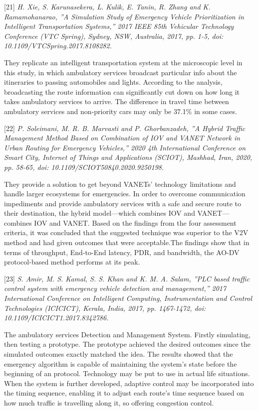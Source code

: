\documentclass[conference]{IEEEtran}
\begin{document}
[21]\emph{ H. Xie, S. Karunasekera, L. Kulik, E. Tanin, R.
Zhang and K. Ramamohanarao, ”A Simulation Study of
Emergency Vehicle Prioritization in Intelligent Transportation
Systems,” 2017 IEEE 85th Vehicular Technology Conference
(VTC Spring), Sydney, NSW, Australia, 2017, pp. 1-5, doi:
10.1109/VTCSpring.2017.8108282. }

They replicate an intelligent transportation system at the microscopic level in this study, in which ambulatory services broadcast particular info about the itineraries to passing automobiles and lights. According to the analysis, broadcasting the route information can significantly cut down on how long it takes ambulatory services to arrive. The difference in travel time between ambulatory services and non-priority cars may only be 37.1\% in some cases.

[22]\emph{ P. Soleimani, M. R. B. Marvasti and P. Ghorbanzadeh,
”A Hybrid Traffic Management Method Based on Combination
of IOV and VANET Network in Urban Routing for Emergency
Vehicles,” 2020 4th International Conference on Smart City,
Internet of Things and Applications (SCIOT), Mashhad, Iran,
2020, pp. 58-65, doi: 10.1109/SCIOT50840.2020.9250198. }

 They provide a solution to get beyond VANETs' technology limitations and handle larger ecosystems for emergencies. In order to overcome communication impediments and provide ambulatory services with a safe and secure route to their destination, the hybrid model—which combines IOV and VANET—combines IOV and VANET. Based on the findings from the four assessment criteria, it was concluded that the suggested technique was superior to the V2V method and had given outcomes that were acceptable.The findings show that in terms of throughput, End-to-End latency,  PDR, and bandwidth, the AO-DV protocol-based method performs at its peak.
 
[23]\emph{ S. Amir, M. S. Kamal, S. S. Khan and K. M. A. Salam,
”PLC based traffic control system with emergency vehicle
detection and management,” 2017 International Conference
on Intelligent Computing, Instrumentation and Control Technologies (ICICICT), Kerala, India, 2017, pp. 1467-1472, doi:
10.1109/ICICICT1.2017.8342786. }

The ambulatory services Detection and Management System. Firstly simulating, then testing a prototype. The prototype achieved the desired outcomes since the simulated outcomes exactly matched the idea. The results showed that the emergency algorithm is capable of maintaining the system's state before the beginning of an protocol. Technology may be put to use in actual life situations. When the system is further developed, adaptive control may be incorporated into the timing sequence, enabling it to adjust each route's time sequence based on how much traffic is travelling along it, so offering congestion control.
\end{document}

